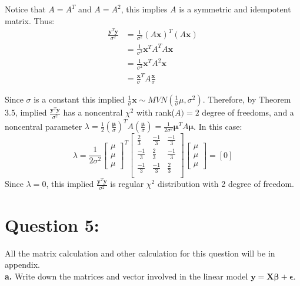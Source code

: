 \documentclass[12 pt, a4paper]{article}
\begin{document}
Notice that $A=A^T$ and $A=A^2$, this implies $A$ is a symmetric and idempotent  matrix.  Thus: \\

\begin{align*}
\frac{\textbf{y}^T\textbf{y}}{\sigma^2}&=\frac{1}{\sigma^2}(A\textbf{x})^T(A\textbf{x}) \\
&=\frac{1}{\sigma^2}\textbf{x}^TA^TA\textbf{x} \\
&=\frac{1}{\sigma^2}\textbf{x}^TA^2\textbf{x} \\
&=\frac{\textbf{x}}{\sigma}^TA\frac{\textbf{x}}{\sigma}
\end{align*}

\noindent Since $\sigma$ is a constant this implied $\frac{1}{\sigma}\textbf{x} \sim MVN(\frac{1}{\sigma}\mu, \sigma^2)$.  Therefore, by Theorem 3.5,  implied $\frac{\textbf{y}^T\textbf{y}}{\sigma^2}$ has a noncentral $\chi^2$ with rank($A)=2$ degree of freedoms, and a noncentral parameter $\lambda=\frac{1}{2}\left(\frac{\boldsymbol{\mu}}{\sigma}\right)^TA\left(\frac{\boldsymbol{\mu}}{\sigma}\right)=\frac{1}{2\sigma^2}\boldsymbol{\mu}^TA\boldsymbol{\mu}$. In this case: \[ \lambda = \frac{1}{2\sigma^2} 
\begin{bmatrix}
\mu \\ \mu \\ \mu
\end{bmatrix} ^T
\begin{bmatrix}
\frac{2}{3} & \frac{-1}{3} & \frac{-1}{3} \\
 \frac{-1}{3} & \frac{2}{3} & \frac{-1}{3} \\
 \frac{-1}{3} & \frac{-1}{3} & \frac{2}{3} \\
\end{bmatrix}
\begin{bmatrix}
\mu \\ \mu \\ \mu
\end{bmatrix}
=[0]
\]
Since $\lambda=0$,  this implied $\frac{\textbf{y}^T\textbf{y}}{\sigma^2}$ is regular $\chi^2$ distribution with 2 degree of freedom.


\section*{Question 5:}

\noindent All the matrix calculation and other calculation for this question will be in appendix.\\

\noindent \textbf{a.} Write down the matrices and vector involved in the linear model $\textbf{y}=\textbf{X} \boldsymbol{\beta}+ \boldsymbol{\epsilon}$. \\
\end{document}
